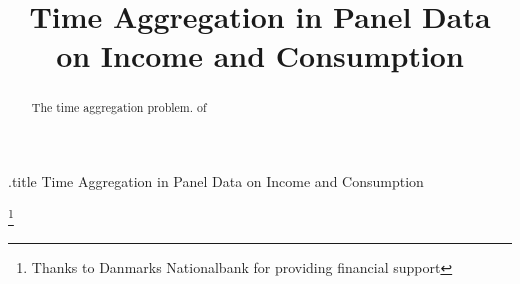 \documentclass[titlepage]{\econtex}\newcommand{\texname}{BPP_TimeAgg}
\begin{document}




\begin{verbatimwrite}{\jobname.title}
Time Aggregation in Panel Data on Income and Consumption
\end{verbatimwrite}

\hfill{\tiny \jobname}

\title{Time Aggregation in Panel Data \\ on Income and Consumption}



\maketitle

\begin{abstract}
    The time aggregation problem. of \cite{working_note_1960}
%  
\end{abstract}


\begin{authorsinfo}
\end{authorsinfo}
\thanks{Thanks to Danmarks Nationalbank for providing financial support}

\titlepagefinish
\setcounter{page}{1}

\pagebreak
\end{document}
